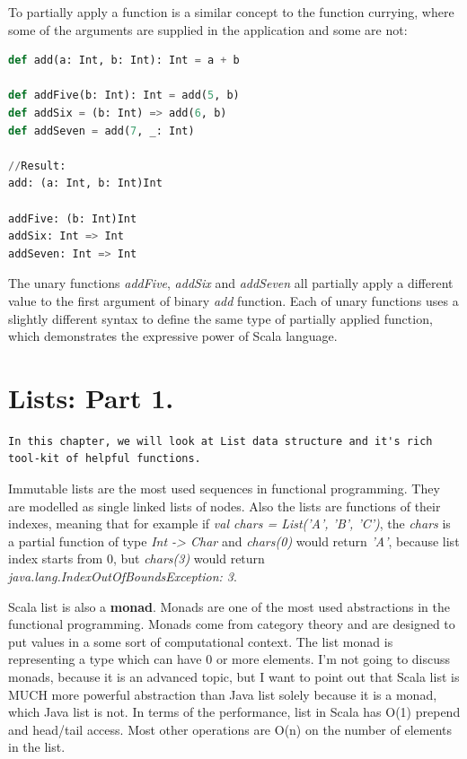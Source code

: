 \documentclass[12pt,twoside,a4paper]{report}
\begin{document}
To partially apply a function is a similar concept to the function currying, where some of the arguments are supplied in the application and some are not:
\begin{lstlisting}[language=python]
def add(a: Int, b: Int): Int = a + b
  
def addFive(b: Int): Int = add(5, b)
def addSix = (b: Int) => add(6, b)
def addSeven = add(7, _: Int)

//Result:
add: (a: Int, b: Int)Int

addFive: (b: Int)Int
addSix: Int => Int
addSeven: Int => Int
\end{lstlisting}

The unary functions \emph{addFive}, \emph{addSix} and \emph{addSeven} all partially apply a different value to the first argument of binary \emph{add} function. Each of unary functions uses a slightly different syntax to define the same type of partially applied function, which demonstrates the expressive power of Scala language.

\section{Lists: Part 1.}\label{6.7}

\begin{lstlisting}
In this chapter, we will look at List data structure and it's rich tool-kit of helpful functions.
\end{lstlisting}

Immutable lists are the most used sequences in functional programming. They are modelled as single linked lists of nodes. Also the lists are functions of their indexes, meaning that for example if \emph{val chars = List('A', 'B', 'C')}, the \emph{chars} is a partial function of type \emph{Int -> Char} and \emph{chars(0)} would return \emph{'A'}, because list index starts from 0, but \emph{chars(3)} would return \emph{ java.lang.IndexOutOfBoundsException: 3}. 

Scala list is also a \textbf{monad}. Monads are one of the most used abstractions in the functional programming. Monads come from category theory and are designed to put values in a some sort of computational context. The list monad is representing a type which can have 0 or more elements. I'm not going to discuss monads, because it is an advanced topic, but I want to point out that Scala list is MUCH more powerful abstraction than Java list solely because it is a monad, which Java list is not. In terms of the performance,  list in Scala has O(1) prepend and head/tail access. Most other operations are O(n) on the number of elements in the list.
\end{document}
